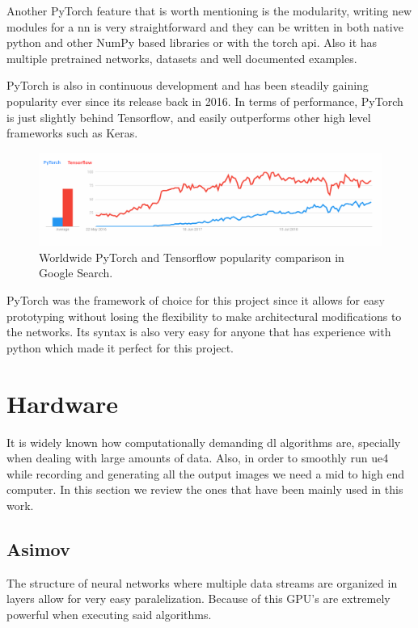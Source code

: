 Another PyTorch feature that is worth mentioning is the modularity, writing new modules for a \gls{nn} is very straightforward and they can be written in both native python and other NumPy based libraries or with the torch \gls{api}. Also it has multiple pretrained networks, datasets and well documented examples.

PyTorch is also in continuous development and has been steadily gaining popularity ever since its release back in 2016. In terms of performance, PyTorch is just slightly behind Tensorflow, and easily outperforms other high level frameworks such as Keras.

\begin{figure}[h]
	\includegraphics[width=\textwidth]{archivos/pytorch.png}
	\centering
	\caption{Worldwide PyTorch and Tensorflow popularity comparison in Google Search.}
	\label{fig:pytorch}
\end{figure}

PyTorch was the framework of choice for this project since it allows for easy prototyping without losing the flexibility to make architectural modifications to the networks. Its syntax is also very easy for anyone that has experience with python which made it perfect for this project.

\section{Hardware}
It is widely known how computationally demanding \gls{dl} algorithms are, specially when dealing with large amounts of data. Also, in order to smoothly run \gls{ue4} while recording and generating all the output images we need a mid to high end computer. In this section we review the ones that have been mainly used in this work.

\subsection{Asimov}

The structure of neural networks where multiple data streams are organized in layers allow for very easy paralelization. Because of this GPU's are extremely powerful when executing said algorithms.

